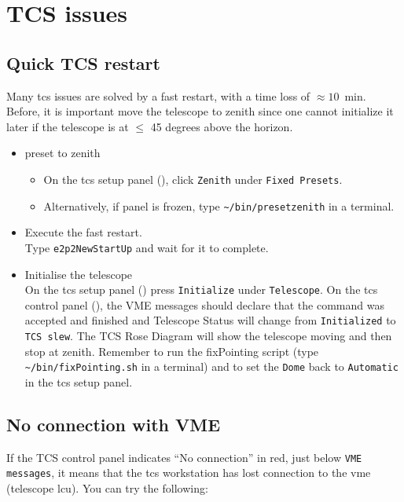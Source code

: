\documentclass[11pt,fleqn,a4paper]{book}
\def\home{\textasciitilde{}}
\begin{document}
\section{TCS issues}
\subsection{Quick TCS restart}
\label{sec:tcsrestart}

Many \gls{tcs} issues are solved by a fast restart, with a time loss of $\approx 10$~min. Before, it is important move the telescope to zenith since one cannot initialize it later if the telescope is at $\le$ 45 degrees above the horizon.

\begin{itemize}
 \item \gls{preset} to zenith
    \begin{itemize}
	\item On the \gls{tcs} setup panel (), click \texttt{Zenith} under \texttt{Fixed Presets}.
        \item Alternatively, if panel is frozen, type \texttt{\home/bin/presetzenith} in a terminal.
    \end{itemize}
 \item Execute the fast restart.\\
       Type \texttt{e2p2NewStartUp} and wait for it to complete.
 \item Initialise the telescope\\
       On the \gls{tcs} setup panel () press \texttt{Initialize} under \texttt{Telescope}. On the \gls{tcs} control panel (), the VME messages should declare that the command was accepted and finished and Telescope Status will change from \texttt{Initialized} to \texttt{TCS slew}. The TCS Rose Diagram will show the telescope moving and then stop at zenith. Remember to run the  fixPointing script (type \texttt{\home/bin/fixPointing.sh} in a terminal) and to set the \texttt{Dome} back to \texttt{Automatic} in the \gls{tcs} setup panel.
\end{itemize}

\subsection{No connection with VME}
If the \gls{TCS control panel} indicates ``No connection'' in red, just below \texttt{VME messages}, it means that the \gls{tcs} workstation has lost connection to the \gls{vme} (telescope \gls{lcu}). You can try the following:
\end{document}
